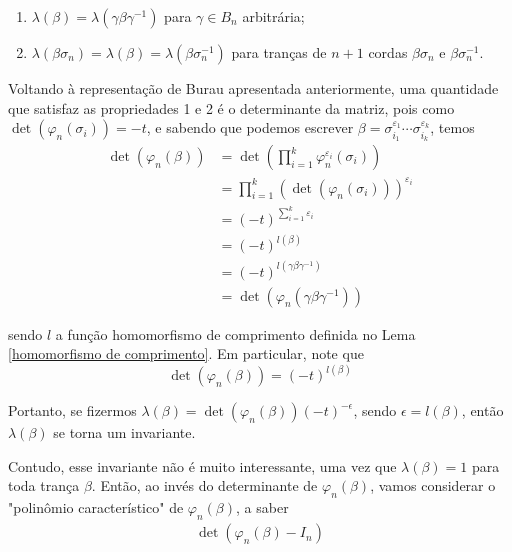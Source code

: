 	\begin{enumerate}
		\item $\lambda(\beta) = \lambda(\gamma\beta\gamma^{-1})$ para $\gamma\in B_n$ arbitrária;
		\item $\lambda(\beta\sigma_n) = \lambda(\beta) = \lambda(\beta\sigma_n^{-1})$ para tranças de $n+1$ cordas $\beta\sigma_n$ e $\beta\sigma_n^{-1}$.
	\end{enumerate}
	\par\vspace{0.3cm} Voltando à representação de Burau apresentada anteriormente, uma quantidade que satisfaz as propriedades 1 e 2 é o determinante da matriz, pois como $\det(\varphi_n(\sigma_i)) = -t$, e sabendo que podemos escrever $\beta = \sigma_{i_1}^{\varepsilon_1}\cdots\sigma_{i_k}^{\varepsilon_k}$, temos
	\begin{align*} 
	\det(\varphi_n(\beta)) 
	&= 
	\det\left( \prod_{i=1}^{k}\varphi_n^{\varepsilon_i}(\sigma_i) \right)
	\\ 
	&= \prod_{i=1}^{k}(\det(\varphi_n(\sigma_i)))^{\varepsilon_i}
	\\ 
	&= (-t)^{\sum_{i=1}^{k}\varepsilon_i}
	\\
	&=(-t)^{l(\beta)} 
	\\
	&=(-t)^{l(\gamma\beta\gamma^{-1})} 
	\\
	&=\det(\varphi_n(\gamma\beta\gamma^{-1}))
	\end{align*} 
	\par\vspace{0.3cm} sendo $l$ a função homomorfismo de comprimento definida no Lema \eqref{homomorfismo de comprimento}. Em particular, note que
	\begin{equation}
	\label{det Burau de beta}
	\det(\varphi_n(\beta)) = (-t)^{l(\beta)}
	\end{equation}
	\par \vspace{0.3cm} Portanto, se fizermos $\lambda(\beta) = \det(\varphi_n(\beta))(-t)^{-\epsilon}$, sendo $\epsilon=l(\beta)$, então $\lambda(\beta)$ se torna um invariante. 
	\par\vspace{0.3cm} Contudo, esse invariante não é muito interessante, uma vez que $\lambda(\beta) = 1$ para toda trança $\beta$. Então, ao invés do determinante de $\varphi_n(\beta)$, vamos considerar o "polinômio característico" de $\varphi_n(\beta)$, a saber
	\begin{align*}
	\det(\varphi_n(\beta) - I_n)
	\end{align*}
